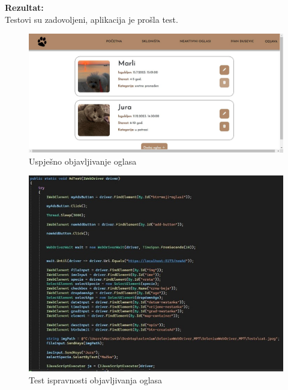 			
			\noindent \textbf{Rezultat:}\\
			Testovi su zadovoljeni, aplikacija je prošla test.\\
			\begin{figure}[H]
				\includegraphics[width=\textwidth]{uspjesno_objavljivanje_oglasa.JPEG}
				\centering
				\caption{Uspješno objavljivanje oglasa}
				\label{fig:uspjesnoobjavljivanjeoglasa}
			\end{figure}
			\begin{figure}[H]
				\includegraphics[width=\textwidth]{2test_postad_1.JPEG}
				\centering
				\caption{Test ispravnosti objavljivanja oglasa}
				\label{fig:testpostad1}
			\end{figure}
